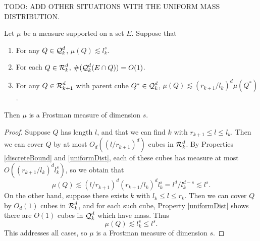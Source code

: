 TODO: ADD OTHER SITUATIONS WITH THE UNIFORM MASS DISTRIBUTION.

\begin{lemma}
	Let $\mu$ be a measure supported on a set $E$. Suppose that
    \begin{enumerate}
    	\item \label{discreteBound} For any $Q \in \operatorname{\mathcal{Q}}_k^d$, $\mu(Q) \lesssim l_k^s$.
    	\item \label{controlledScale} For each $Q \in \operatorname{\mathcal{R}}_k^d$, $\#(\operatorname{\mathcal{Q}}_k^d(E \cap Q)) = O(1)$.
    	\item \label{uniformDist} For any $Q \in \operatorname{\mathcal{R}}_{k+1}^d$ with parent cube $Q^* \in \operatorname{\mathcal{Q}}_k^d$, $\mu(Q) \lesssim (r_{k+1}/l_k)^d \mu(Q^*)$.
    \end{enumerate}
	Then $\mu$ is a Frostman measure of dimension $s$.
\end{lemma}
\begin{proof}
	Suppose $Q$ has length $l$, and that we can find $k$ with $r_{k+1} \leq l \leq l_k$. Then we can cover $Q$ by at most $O_d((l/r_{k+1})^d)$ cubes in $\operatorname{\mathcal{R}}_k^d$. By Properties \ref{discreteBound} and \ref{uniformDist}, each of these cubes has measure at most $O( (r_{k+1}/l_k)^d l_k^s)$, so we obtain that
    \[ \mu(Q) \lesssim (l/r_{k+1})^d (r_{k+1}/l_k)^d l_k^s = l^d / l_k^{d-s} \lesssim l^s. \]
    On the other hand, suppose there exists $k$ with $l_k \leq l \leq r_k$. Then we can cover $Q$ by $O_d(1)$ cubes in $\operatorname{\mathcal{R}}_k^d$, and for each such cube, Property \ref{uniformDist} shows there are $O(1)$ cubes in $\operatorname{\mathcal{Q}}_k^d$ which have mass. Thus
    \[ \mu(Q) \lesssim l_k^s \leq l^s. \]
    This addresses all cases, so $\mu$ is a Frostman measure of dimension $s$.
\end{proof}


